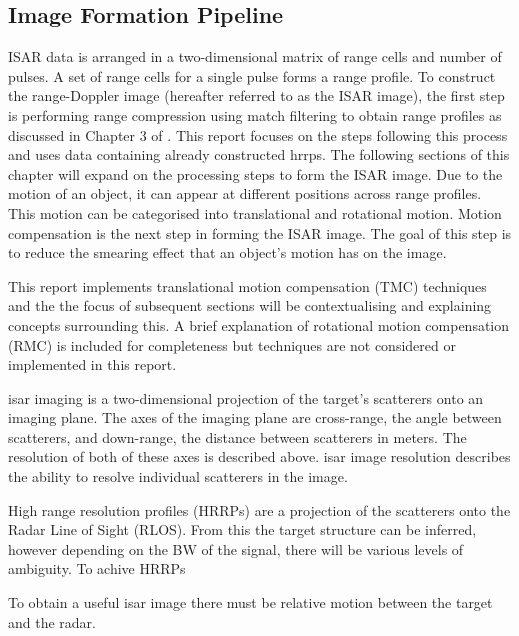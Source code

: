 \documentclass[class=report,11pt,crop=false]{standalone}
\begin{document}
    \subsection{Image Formation Pipeline}
    ISAR data is arranged in a two-dimensional matrix of range cells and number of pulses. A set of range cells for a single pulse forms a range profile. To construct the range-Doppler image (hereafter referred to as the ISAR image), the first step is performing range compression using match filtering to obtain range profiles as discussed in Chapter 3 of \cite{ISARtextbook_Martorella}. This report focuses on the steps following this process and uses data containing already constructed \gls{hrrp}s. The following sections of this chapter will expand on the processing steps to form the ISAR image. Due to the motion of an object, it can appear at different positions across range profiles. This motion can be categorised into translational and rotational motion. Motion compensation is the next step in forming the ISAR image. The goal of this step is to reduce the smearing effect that an object's motion has on the image. %
    
    This report implements translational motion compensation (TMC) techniques and the the focus of subsequent sections will be contextualising and explaining concepts surrounding this. A brief explanation of rotational motion compensation (RMC) is included for completeness but techniques are not considered or implemented in this report. 
    
    \gls{isar} imaging is a two-dimensional projection of the target's scatterers onto an imaging plane. The axes of the imaging plane are cross-range, the angle between scatterers, and down-range, the distance between scatterers in meters. %
    The resolution of both of these axes is described above.
    \gls{isar} image resolution describes the ability to resolve individual scatterers in the image. %
    
    High range resolution profiles (HRRPs) are a projection of the scatterers onto the Radar Line of Sight (RLOS). From this the target structure can be inferred, however depending on the BW of the signal, there will be various levels of ambiguity. %
    To achive HRRPs
    
    To obtain a useful \gls{isar} image there must be relative motion between the target and the radar. %
    
\end{document}
